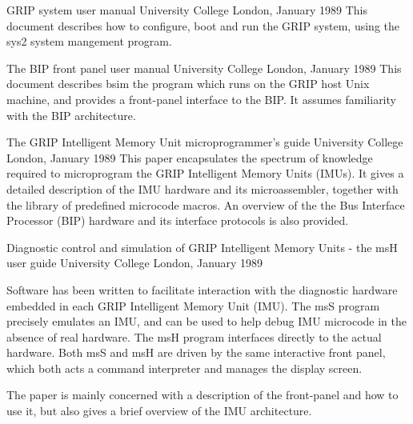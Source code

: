 {GRIP system user manual}
{University College London, January 1989}
{
This document describes how to configure, boot and run the GRIP system,
using the sys2 system mangement program.
}

{The BIP front panel user manual}
{University College London, January 1989}
{
This document describes {bsim} the program which runs on the GRIP host
Unix machine, and provides a front-panel interface to the BIP.
It assumes familiarity with the BIP architecture.
}

{The GRIP Intelligent Memory Unit microprogrammer's guide}
{University College London, January 1989}
{
This paper encapsulates the spectrum of knowledge required to microprogram
the GRIP Intelligent Memory Units (IMUs). It gives a detailed 
description of the IMU hardware and its microassembler, together with 
the library of predefined microcode macros.
An overview of the the Bus Interface 
Processor (BIP) hardware and its interface protocols is also provided.
}

{Diagnostic control and simulation of GRIP Intelligent Memory Units - the
msH user guide}
{University College London, January 1989}
{
Software has been written to facilitate interaction with the diagnostic
hardware embedded in each GRIP Intelligent Memory Unit (IMU).
The msS program precisely emulates an IMU, and can be used to help
debug IMU microcode in the absence of real hardware.
The msH program interfaces directly to the actual hardware.
Both msS and msH are driven by the same interactive front panel, which 
both acts a command interpreter and manages the display screen.

The paper is mainly concerned with a description of the front-panel and
how to use it, but also gives a brief overview of the IMU architecture.
}


